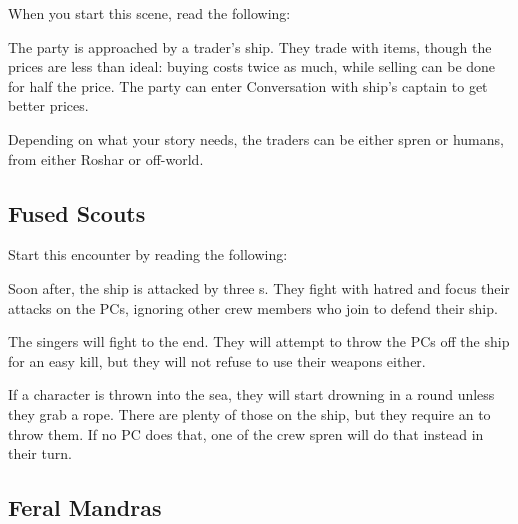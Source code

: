 When you start this scene, read the following:


The party is approached by a trader's ship. They trade with items, though the prices are less than ideal: buying costs twice as much, while selling can be done for half the price. The party can enter Conversation with ship's captain to get better prices.

Depending on what your story needs, the traders can be either spren or humans, from either Roshar or off-world.




\subsection{Fused Scouts}
\label{ssec:shadesmarSeaEncountersFused}

Start this encounter by reading the following:


Soon after, the ship is attacked by three \enemySingerHaevenlyOne{}s. They fight with hatred and focus their attacks on the PCs, ignoring other crew members who join to defend their ship.

The singers will fight to the end. They will attempt to throw the PCs off the ship for an easy kill, but they will not refuse to use their weapons either.

If a character is thrown into the sea, they will start drowning in a round unless they grab a rope. There are plenty of those on the ship, but they require an \iconAction{} to throw them. If no PC does that, one of the crew spren will do that instead in their turn. 




\subsection{Feral Mandras}


